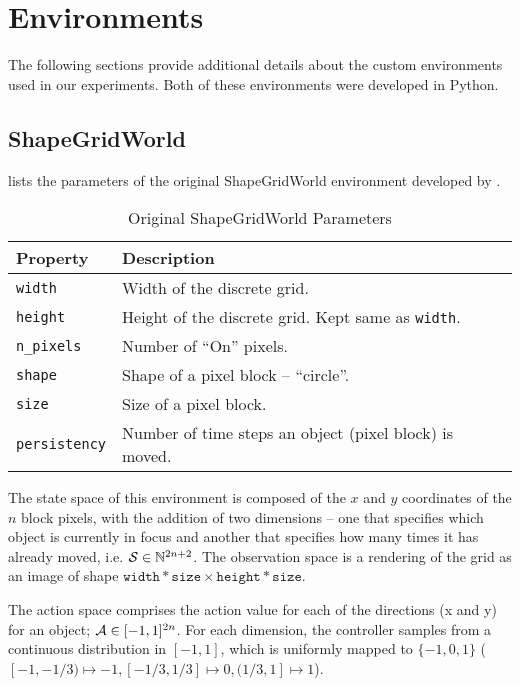 \chapter{Environments}
The following sections provide additional details about the custom environments used in our experiments.
Both of these environments were developed in Python.

\section{ShapeGridWorld}
\label{sec:sgw-details}
 lists the parameters of the original ShapeGridWorld environment developed by \cite{rair}.
\begin{table}[H]
    \centering
    \begin{tabularx}{\textwidth}{C{4.2cm} L}
        \hline
        Property & Description\\
        \hline
        \texttt{width} & Width of the discrete grid.\\
        \texttt{height} & Height of the discrete grid. Kept same as \texttt{width}.\\
        \texttt{n\_pixels} & Number of ``On'' pixels.\\
        \texttt{shape} & Shape of a pixel block -- ``circle''.\\
        \texttt{size} & Size of a pixel block.\\
        \texttt{persistency} & Number of time steps an object (pixel block) is moved. \\
        \hline
    \end{tabularx}
    \caption{Original ShapeGridWorld Parameters}
    \label{tab:original-sgw-params}
\end{table}
The state space of this environment is composed of the \(x\) and \(y\) coordinates of the \(n\) block pixels, with the addition of two dimensions -- one that specifies which object is currently in focus and another that specifies how many times it has already moved, i.e. \(\mathcal{S} \in \mathbb{N}^{2 n + 2}\).
The observation space is a rendering of the grid as an image of shape \(\texttt{width} * \texttt{size} \times \texttt{height} * \texttt{size}\).

The action space comprises the action value for each of the directions (x and y) for an object; \(\mathcal{A} \in [-1, 1]^{2 n}\).
For each dimension, the controller samples from a continuous distribution in \([-1, 1]\), which is uniformly mapped to \(\{-1, 0, 1\}\) (\([-1, -1/3) \mapsto -1, [-1/3, 1/3] \mapsto 0, (1/3, 1] \mapsto 1\)).

